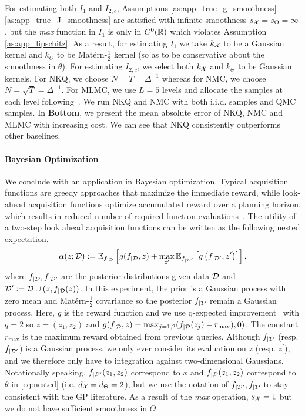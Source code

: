 For estimating both $I_1$ and $I_{2,c}$, Assumptions \ref{as:app_true_g_smoothness}\ref{as:app_true_J_smoothness} are satisfied with infinite smoothness $s_{\mathcal{X}}= s_\Theta =\infty$, but the \textit{max} function in $I_{1}$ is only in $C^0(\mathbb{R})$ which violates Assumption \ref{as:app_lipschitz}. 
As a result, for estimating $I_1$ we take $k_{\mathcal{X}}$ to be a Gaussian kernel and $k_\Theta$ to be Mat\'ern-$\frac{1}{2}$ kernel (so as to be conservative about the smoothness in $\theta$). For estimating $I_{2,c}$, we select both $k_{\mathcal{X}}$ and $k_\Theta$ to be Gaussian kernels. 
For NKQ, we choose $N = T =\Delta^{-1}$ whereas 
for NMC, we choose $N = \sqrt{T} =\Delta^{-1}$. 
For MLMC, we use $L=5$ levels and allocate the samples at each level following~\citet{giles2019decision}. 
We run NKQ and NMC with both i.i.d. samples and QMC samples.
In  \textbf{Bottom}, we present the mean absolute error of NKQ, NMC and MLMC with increasing cost. 
We can see that NKQ consistently outperforms other baselines. 


\paragraph{Bayesian Optimization}
We conclude with an application in Bayesian optimization. Typical acquisition functions are greedy approaches that maximize the immediate reward, while look-ahead acquisition functions optimize accumulated reward over a planning horizon, which results in reduced number of required function evaluations~\citep{Ginsbourger2010,gonzalez2016glasses,wu2019practical,Yang2024}. 
The utility of a two-step look ahead acquisition functions can be written as the following nested expectation.
\begin{align*}
    \alpha(z ; \mathcal{D}) := \operatorname{\mathbb{E}}_{f_{\mid \mathcal{D}} } \left[g(f_{\mid \mathcal{D}}, z) + \max _{z^\prime} \operatorname{\mathbb{E}}_{f_{\mid \mathcal{D}^\prime}  } \left[g \left(f_{\mid \mathcal{D}^\prime}, z^\prime \right)\right]\right],
\end{align*}
where $f_{\mid \mathcal{D}}, f_{\mid \mathcal{D}^\prime}$ are the posterior distributions given data $\mathcal{D}$ and $\mathcal{D}^\prime:= \mathcal{D} \cup (z , f_{\mid \mathcal{D}}(z))$. 
In this experiment, the prior is a Gaussian process with zero mean and Mat\'{e}rn-$\frac{1}{2}$ covariance so the posterior $f_{\mid \mathcal{D}}$ remain a Gaussian process.
Here, $g$ is the reward function and we use q-expected improvement~\cite{wang2020parallel} with $q=2$ so $z=(z_1, z_2)$ and
$g(f_{\mid \mathcal{D}}, z) = \max _{j=1, 2} ( f_{\mid \mathcal{D}}(z_j) - r_{\max} ), 0)$. The constant 
$r_{\max}$ is the maximum reward obtained from previous queries.
Although $f_{\mid \mathcal{D}} $ (resp. $f_{\mid \mathcal{D}^\prime}$) is a Gaussian process, we only ever consider its evaluation on $z$ (resp. $z^\prime$), and we therefore only have to integration against two-dimensional Gaussians. 
Notationally speaking, $f_{\mid \mathcal{D}^\prime}(z_1, z_2)$ correspond to $x$ and $f_{\mid \mathcal{D}}(z_1, z_2)$ correspond to $\theta$ in \eqref{eq:nested} (i.e. $d_{\mathcal{X}} = d_\Theta = 2$), but we use the notation of $f_{\mid \mathcal{D}^\prime}, f_{\mid \mathcal{D}}$ to stay consistent with the GP literature. 
As a result of the \textit{max} operation, $s_{\mathcal{X}} = 1$ but we do not have sufficient smoothness in $\Theta$.


